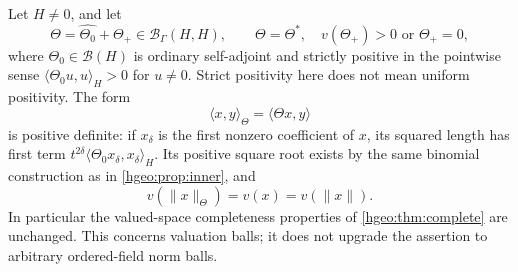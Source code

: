 \documentclass[11pt,letterpaper]{article}
\numberwithin{equation}{section}
\theoremstyle{definition}
\theoremstyle{remark}
\newcommand{\BH}{\mathscr B_\Gamma(H,H)}
\newcommand{\ip}[2]{\langle #1,#2\rangle}
\newcommand{\norm}[1]{\lVert #1\rVert}
\begin{document}
Let $H\ne0$, and let
\begin{equation}\label{hgeo:eq:metricTheta}
 \Theta=\widehat{\Theta_0}+\Theta_+\in\BH,\qquad \Theta=\Theta^*,\quad
 v(\Theta_+)>0\text{ or }\Theta_+=0,
\end{equation}
where $\Theta_0\in\mathcal B(H)$ is ordinary self-adjoint and strictly
positive in the pointwise sense $\ip{\Theta_0u}{u}_H>0$ for $u\ne0$. Strict
positivity here does not mean uniform positivity. The form
\begin{equation}\label{hgeo:eq:innerTheta}
 \ip{x}{y}_\Theta=\ip{\Theta x}{y}
\end{equation}
is positive definite: if $x_\delta$ is the first nonzero coefficient of
$x$, its squared length has first term $t^{2\delta}\ip{\Theta_0x_\delta}
{x_\delta}_H$. Its positive square root exists by the same binomial
construction as in \cref{hgeo:prop:inner}, and
\begin{equation}\label{hgeo:eq:metricval}
 v(\norm{x}_\Theta)=v(x)=v(\norm{x}).
\end{equation}
In particular the valued-space completeness properties of
\cref{hgeo:thm:complete} are unchanged. This concerns valuation balls; it
does not upgrade the assertion to arbitrary ordered-field norm balls.
\end{document}
